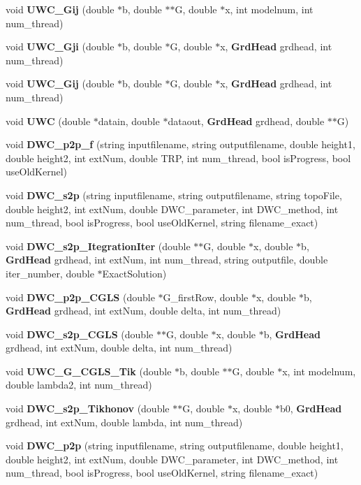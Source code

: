 \begin{DoxyCompactItemize}
\item 
void \textbf{ U\+W\+C\+\_\+\+Gij} (double $\ast$b, double $\ast$$\ast$G, double $\ast$x, int modelnum, int num\+\_\+thread)
\item 
void \textbf{ U\+W\+C\+\_\+\+Gji} (double $\ast$b, double $\ast$G, double $\ast$x, \textbf{ Grd\+Head} grdhead, int num\+\_\+thread)
\item 
void \textbf{ U\+W\+C\+\_\+\+Gij} (double $\ast$b, double $\ast$G, double $\ast$x, \textbf{ Grd\+Head} grdhead, int num\+\_\+thread)
\item 
void \textbf{ U\+WC} (double $\ast$datain, double $\ast$dataout, \textbf{ Grd\+Head} grdhead, double $\ast$$\ast$G)
\item 
void \textbf{ D\+W\+C\+\_\+p2p\+\_\+f} (string inputfilename, string outputfilename, double height1, double height2, int ext\+Num, double T\+RP, int num\+\_\+thread, bool is\+Progress, bool use\+Old\+Kernel)
\item 
void \textbf{ D\+W\+C\+\_\+s2p} (string inputfilename, string outputfilename, string topo\+File, double height2, int ext\+Num, double D\+W\+C\+\_\+parameter, int D\+W\+C\+\_\+method, int num\+\_\+thread, bool is\+Progress, bool use\+Old\+Kernel, string filename\+\_\+exact)
\item 
void \textbf{ D\+W\+C\+\_\+s2p\+\_\+\+Itegration\+Iter} (double $\ast$$\ast$G, double $\ast$x, double $\ast$b, \textbf{ Grd\+Head} grdhead, int ext\+Num, int num\+\_\+thread, string outputfile, double iter\+\_\+number, double $\ast$Exact\+Solution)
\item 
void \textbf{ D\+W\+C\+\_\+p2p\+\_\+\+C\+G\+LS} (double $\ast$G\+\_\+first\+Row, double $\ast$x, double $\ast$b, \textbf{ Grd\+Head} grdhead, int ext\+Num, double delta, int num\+\_\+thread)
\item 
void \textbf{ D\+W\+C\+\_\+s2p\+\_\+\+C\+G\+LS} (double $\ast$$\ast$G, double $\ast$x, double $\ast$b, \textbf{ Grd\+Head} grdhead, int ext\+Num, double delta, int num\+\_\+thread)
\item 
void \textbf{ U\+W\+C\+\_\+\+G\+\_\+\+C\+G\+L\+S\+\_\+\+Tik} (double $\ast$b, double $\ast$$\ast$G, double $\ast$x, int modelnum, double lambda2, int num\+\_\+thread)
\item 
void \textbf{ D\+W\+C\+\_\+s2p\+\_\+\+Tikhonov} (double $\ast$$\ast$G, double $\ast$x, double $\ast$b0, \textbf{ Grd\+Head} grdhead, int ext\+Num, double lambda, int num\+\_\+thread)
\item 
void \textbf{ D\+W\+C\+\_\+p2p} (string inputfilename, string outputfilename, double height1, double height2, int ext\+Num, double D\+W\+C\+\_\+parameter, int D\+W\+C\+\_\+method, int num\+\_\+thread, bool is\+Progress, bool use\+Old\+Kernel, string filename\+\_\+exact)

\end{DoxyCompactItemize}
